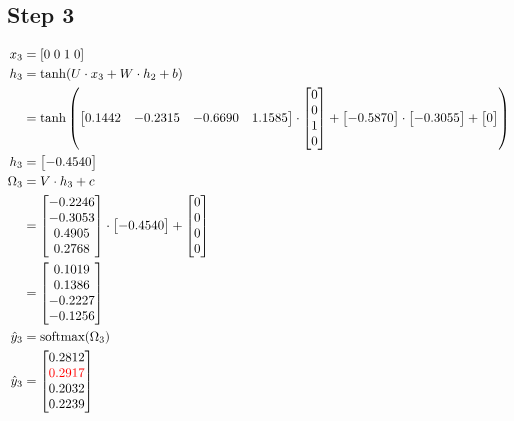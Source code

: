 \documentclass{article}
\begin{document}
\subsection{Step 3}
\begin{align*}
    x_3 & = [0 \; 0\; 1\; 0] \\
    h_3 & = \tanh(U \cdot x_3 + W \cdot h_2 + b) \\
    & = \tanh\left(\begin{bmatrix} 0.1442 & -0.2315 & -0.6690 & 1.1585 \end{bmatrix} \cdot \begin{bmatrix} 0 \\ 0 \\ 1 \\ 0 \end{bmatrix} + \begin{bmatrix} -0.5870 \end{bmatrix} \cdot \begin{bmatrix} -0.3055 \end{bmatrix} + \begin{bmatrix} 0 \end{bmatrix}\right) \\
    h_3 & = \begin{bmatrix} -0.4540 \end{bmatrix} \\
    \Omega_3 & = V \cdot h_3 + c \\
    & = \begin{bmatrix} -0.2246 \\ -0.3053 \\ 0.4905 \\ 0.2768 \end{bmatrix} \cdot \begin{bmatrix} -0.4540 \end{bmatrix} + \begin{bmatrix} 0 \\ 0 \\ 0 \\ 0 \end{bmatrix} \\
    & = \begin{bmatrix} 0.1019 \\ 0.1386 \\ -0.2227 \\ -0.1256 \end{bmatrix} \\
    \hat{y}_3 & = \text{softmax}(\Omega_3) \\
    \hat{y}_3 & = \begin{bmatrix} 0.2812 \\ \textcolor{red}{0.2917} \\ 0.2032 \\ 0.2239 \end{bmatrix} \\
\end{align*}
\end{document}
